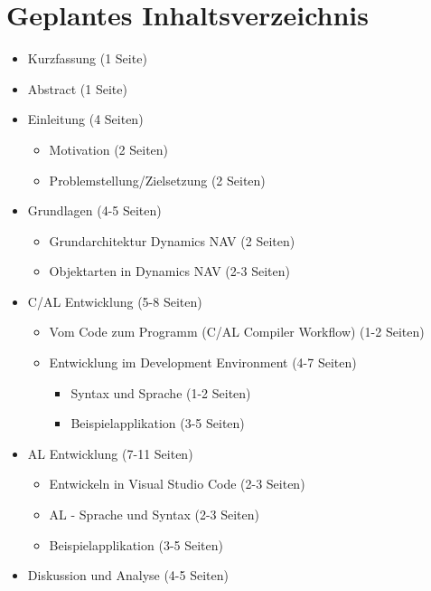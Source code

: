 \chapter{Geplantes Inhaltsverzeichnis}
\label{cha:inhaltsverzeichnis}

\begin{itemize}
	\item Kurzfassung (1 Seite)
	\item Abstract    (1 Seite)
	\item Einleitung  (4 Seiten)
	\begin{itemize}
		\item Motivation (2 Seiten)
		\item Problemstellung/Zielsetzung (2 Seiten)
	\end{itemize}	
	\item Grundlagen (4-5 Seiten)
	\begin{itemize}
		\item Grundarchitektur Dynamics NAV (2 Seiten)
		\item Objektarten in Dynamics NAV (2-3 Seiten)
	\end{itemize}
	\item C/AL Entwicklung (5-8 Seiten)
	\begin{itemize}
		\item Vom Code zum Programm (C/AL Compiler Workflow) (1-2 Seiten)
		\item Entwicklung im Development Environment (4-7 Seiten)
		\begin{itemize}
			\item Syntax und Sprache (1-2 Seiten)
			\item Beispielapplikation (3-5 Seiten)
		\end{itemize}
	\end{itemize}
	\item AL Entwicklung (7-11 Seiten)
	\begin{itemize}
		\item Entwickeln in Visual Studio Code (2-3 Seiten)	
		\item AL - Sprache und Syntax (2-3 Seiten)
		\item Beispielapplikation (3-5 Seiten) 
	\end{itemize}
	\item Diskussion und Analyse (4-5 Seiten)
\end{itemize}